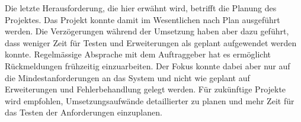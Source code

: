 Die letzte Herausforderung, die hier erwähnt wird, betrifft die Planung des Projektes.
Das Projekt konnte damit im Wesentlichen nach Plan ausgeführt werden.
Die Verzögerungen während der Umsetzung haben aber dazu geführt, dass weniger Zeit für Testen und Erweiterungen als geplant aufgewendet werden konnte.
Regelmässige Absprache mit dem Auftraggeber hat es ermöglicht Rückmeldungen frühzeitig einzuarbeiten.
Der Fokus konnte dabei aber nur auf die Mindestanforderungen an das System und nicht wie geplant auf Erweiterungen und Fehlerbehandlung gelegt werden.
Für zukünftige Projekte wird empfohlen, Umsetzungsaufwände detaillierter zu planen und mehr Zeit für das Testen der Anforderungen einzuplanen.

\clearpage

